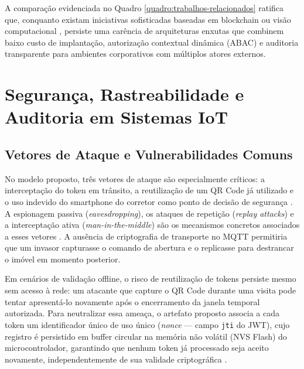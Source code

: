 A comparação evidenciada no Quadro \ref{quadro:trabalhos-relacionados} ratifica que, conquanto existam iniciativas sofisticadas baseadas em blockchain \cite{camargosilvablockchain2023} ou visão computacional \cite{yolov5smartlock2025}, persiste uma carência de arquiteturas enxutas que combinem baixo custo de implantação, autorização contextual dinâmica (ABAC) e auditoria transparente para ambientes corporativos com múltiplos atores externos.

\section{Segurança, Rastreabilidade e Auditoria em Sistemas IoT}
\label{sec:seguranca}

\subsection{Vetores de Ataque e Vulnerabilidades Comuns}
\label{subsec:ameacas}

No modelo proposto, três vetores de ataque são especialmente críticos: a interceptação do token em trânsito, a reutilização de um QR Code já utilizado e o uso indevido do smartphone do corretor como ponto de decisão de segurança \cite{shauto2024, surveysmarthomeauth2021}. A espionagem passiva (\textit{eavesdropping}), os ataques de repetição (\textit{replay attacks}) e a interceptação ativa (\textit{man-in-the-middle}) são os mecanismos concretos associados a esses vetores \cite{shauto2024}. A ausência de criptografia de transporte no MQTT permitiria que um invasor capturasse o comando de abertura e o replicasse para destrancar o imóvel em momento posterior.

Em cenários de validação offline, o risco de reutilização de tokens persiste mesmo sem acesso à rede: um atacante que capture o QR Code durante uma visita pode tentar apresentá-lo novamente após o encerramento da janela temporal autorizada. Para neutralizar essa ameaça, o artefato proposto associa a cada token um identificador único de uso único (\textit{nonce} --- campo \texttt{jti} do JWT), cujo registro é persistido em buffer circular na memória não volátil (NVS Flash) do microcontrolador, garantindo que nenhum token já processado seja aceito novamente, independentemente de sua validade criptográfica \cite{hanotmpp2l2020}.

